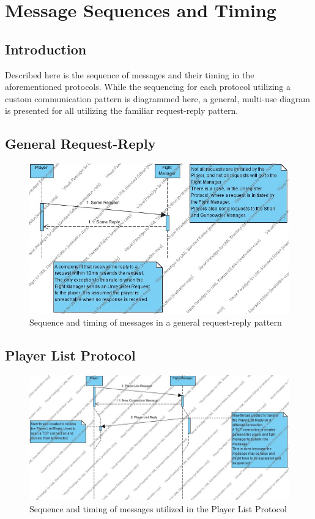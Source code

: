 \documentclass[12pt]{article}
\begin{document}
\section{Message Sequences and Timing}
	\subsection{Introduction}
		Described here is the sequence of messages and their timing in the aforementioned protocols. While the sequencing for each protocol utilizing a custom communication pattern is diagrammed here, a general, multi-use diagram is presented for all utilizing the familiar request-reply pattern.
	\newpage
	\subsection{General Request-Reply}
		\begin{center}
			\begin{figure}[htp]
				\centering
				\includegraphics[width=\textwidth]{Diagrams/Sequence Diagrams/General.jpg}
				\caption{Sequence and timing of messages in a general request-reply pattern}
			\end{figure}
		\end{center}
	\newpage
	\subsection{Player List Protocol}
		\begin{center}
			\begin{figure}[htp]
				\centering
				\includegraphics[width=\textwidth]{Diagrams/Sequence Diagrams/Player List Protocol Sequence.jpg}
				\caption{Sequence and timing of messages utilized in the Player List Protocol}
			\end{figure}
		\end{center}
	\newpage
\end{document}
